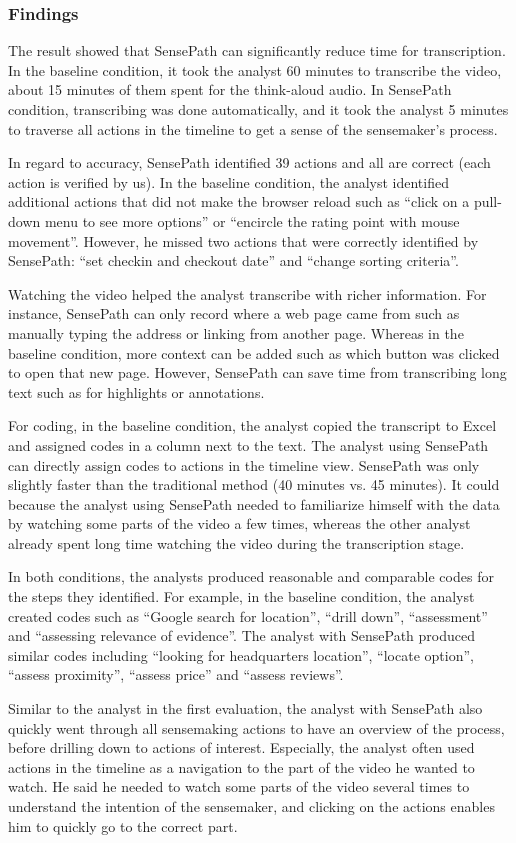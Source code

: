 \subsubsection{Findings}
The result showed that SensePath can significantly reduce time for transcription. In the baseline condition, it took the analyst 60 minutes to transcribe the video, about 15 minutes of them spent for the think-aloud audio. In SensePath condition, transcribing was done automatically, and it took the analyst 5 minutes to traverse all actions in the timeline to get a sense of the sensemaker's process.

In regard to accuracy, SensePath identified 39 actions and all are correct (each action is verified by us). In the baseline condition, the analyst identified additional actions that did not make the browser reload such as ``click on a pull-down menu to see more options'' or ``encircle the rating point with mouse movement''. However, he missed two actions that were correctly identified by SensePath: ``set checkin and checkout date'' and ``change sorting criteria''.

Watching the video helped the analyst transcribe with richer information. For instance, SensePath can only record where a web page came from such as manually typing the address or linking from another page. Whereas in the baseline condition, more context can be added such as which button was clicked to open that new page. However, SensePath can save time from transcribing long text such as for highlights or annotations.

For coding, in the baseline condition, the analyst copied the transcript to Excel and assigned codes in a column next to the text. The analyst using SensePath can directly assign codes to actions in the timeline view. SensePath was only slightly faster than the traditional method (40 minutes vs. 45 minutes). It could because the analyst using SensePath needed to familiarize himself with the data by watching some parts of the video a few times, whereas the other analyst already spent long time watching the video during the transcription stage.

In both conditions, the analysts produced reasonable and comparable codes for the steps they identified. For example, in the baseline condition, the analyst created codes such as ``Google search for location'', ``drill down'', ``assessment'' and ``assessing relevance of evidence''. The analyst with SensePath produced similar codes including ``looking for headquarters location'', ``locate option'', ``assess proximity'', ``assess price'' and ``assess reviews''.

Similar to the analyst in the first evaluation, the analyst with SensePath also quickly went through all sensemaking actions to have an overview of the process, before drilling down to actions of interest. Especially, the analyst often used actions in the timeline as a navigation to the part of the video he wanted to watch. He said he needed to watch some parts of the video several times to understand the intention of the sensemaker, and clicking on the actions enables him to quickly go to the correct part.